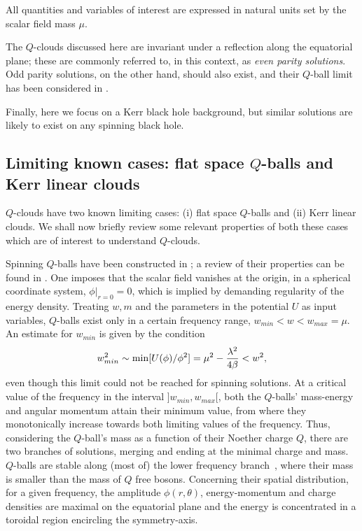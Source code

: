 All quantities and variables of interest are expressed in natural units set by the scalar field mass $\mu$.

The $Q$-clouds discussed here are invariant under a reflection along  
the equatorial plane; these are commonly referred to, in this context, as \textit{even parity solutions}. Odd parity
solutions, on the other hand, should also exist, and their $Q$-ball limit has been considered in 
\cite{Volkov:2002aj,Kleihaus:2007vk}.

Finally, here we focus on a Kerr black hole background, but similar solutions are likely to exist on any spinning black hole.

\subsection{Limiting known cases: flat space $Q$-balls and Kerr linear clouds}



$Q$-clouds have two known limiting cases: (i) flat space $Q$-balls and (ii) Kerr linear clouds. We shall now briefly review some relevant properties of both these cases which are of interest to understand $Q$-clouds. 

\bigskip


Spinning $Q$-balls have been constructed  in 
\cite{Volkov:2002aj,Kleihaus:2005me};
a review of their properties can be found in \cite{Radu:2008pp}.
%
One imposes that the scalar field
vanishes at the origin, in a spherical coordinate system,  $\phi|_{r=0}=0$, which is implied by demanding regularity of the energy density.
Treating $w,m$ and the parameters in the potential $U$
as input variables, $Q$-balls 
exist only in a certain frequency range, 
$w_{min} < w < w_{max}=\mu$.
An estimate for $w_{min}$
is given by the condition 
\cite{Volkov:2002aj,Kleihaus:2005me}
\begin{eqnarray}
 w_{min}^2\sim  {\rm min} [U(\phi)/\phi^2]=\mu^2-\frac{\lambda^2}{4\beta}<w^2,
\end{eqnarray}
even though this limit could not be reached for spinning solutions.
%
At a critical value of the frequency in the interval $]w_{min}, w_{max}[$, 
both the $Q$-balls' mass-energy and angular momentum attain their minimum value,
from where they monotonically increase towards both limiting values
of the frequency.
%
Thus, considering the $Q$-ball's mass as a function of their Noether charge $Q$,
there are two branches of solutions, merging and ending
at the minimal charge and mass. 
$Q$-balls are stable along (most of) the lower frequency branch~\cite{Radu:2008pp},
where their mass is smaller than the mass of $Q$ free bosons.
%
Concerning their spatial distribution, for a given frequency, 
the amplitude $\phi(r,\theta)$, energy-momentum and charge
densities are maximal on the equatorial plane and the energy is concentrated in a toroidal
region encircling the symmetry-axis.


